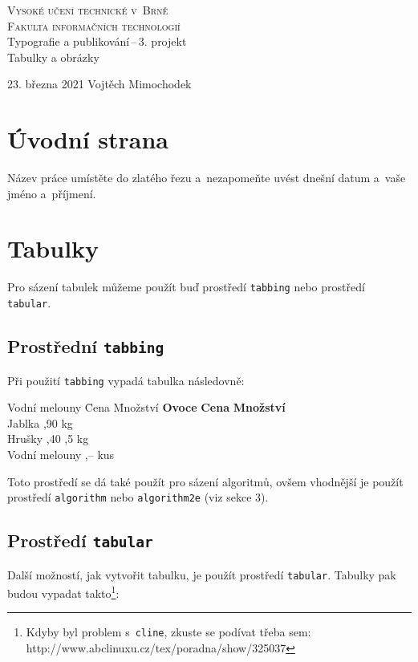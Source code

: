 \documentclass[11pt, a4paper]{article}
\begin{document}
\begin{titlepage}
\begin{center}
{\Huge
\textsc{Vysoké učení technické v~Brně\\[0.4em]}}
{\huge \textsc{Fakulta informačních technologií}}\\
{\Large
Typografie a publikování\,--\,3. projekt\\[0.3em]
\Huge{Tabulky a obrázky}
}

\end{center}

{\Large 23. března 2021 \hfill Vojtěch Mimochodek}
\end{titlepage}

\section{Úvodní strana}
Název práce umístěte do zlatého řezu a~nezapomeňte uvést dnešní datum a~vaše jméno a~příjmení.

\section{Tabulky}
Pro sázení tabulek můžeme použít buď prostředí \verb|tabbing| nebo prostředí \verb|tabular|.

\subsection{Prostřední \texttt{tabbing}}
Při použití \verb|tabbing| vypadá tabulka následovně:

\begin{tabbing}
Vodní melouny \quad \= Cena \quad \= Množství \kill
\textbf{Ovoce} \> \textbf{Cena} \> \textbf{Množství}\\
Jablka ,90  kg\\
Hrušky ,40 ,5 kg\\
Vodní melouny ,--  kus\\
\end{tabbing}
Toto prostředí se dá také použít pro sázení algoritmů, ovšem vhodnější je použít prostředí \verb|algorithm| nebo \verb|algorithm2e| (viz sekce 3).

\subsection{Prostředí \texttt{tabular}}
Další možností, jak vytvořit tabulku, je použít prostředí \verb|tabular|. Tabulky pak budou vypadat takto\footnote{Kdyby byl problem s~{\texttt{cline}}, zkuste se podívat třeba sem: http://www.abclinuxu.cz/tex/poradna/show/325037}:
\end{document}
